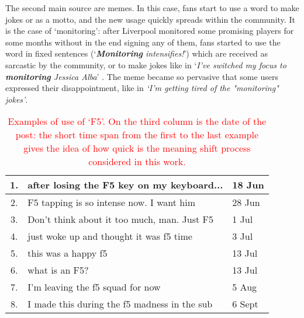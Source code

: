 The second main source are memes. In this case, fans start to use a
word to make jokes or as a motto, and the new usage quickly spreads
within the community. It is the case of `monitoring': after Liverpool
monitored some promising players for some months without in the end
signing any of them, fans started to use the word in fixed sentences
(`\textit{\textbf{Monitoring} intensifies!}') which are received as sarcastic by the
community, or to make jokes like in `\textit{I've switched my focus to
\textbf{monitoring} Jessica Alba}' . The meme became so pervasive that some users expressed their disappointment, like in \textit{`I'm getting tired of the "monitoring" jokes'}. 

\begin{table}[t]\centering   \small
    \begin{tabular}{cp{5.5cm}l}
        \hline
        1. & after losing the F5 key on my keyboard... & 18 Jun\\\hline
        2. & F5 tapping is so intense now. I want him & 28 Jun\\\hline
        3. & Don't think about it too much, man. Just F5 & 1 Jul\\\hline
        4. & just woke up and thought it was f5 time & 3 Jul\\\hline
        5. & this was a happy f5 & 13 Jul\\\hline
        6. & what is an F5? & 13 Jul \\\hline
        7. & I'm leaving the f5 squad for now & 5 Aug\\\hline
        8. & I made this during the f5 madness in the sub & 6 Sept\\\hline
        
    \end{tabular}
    \vspace*{-0.2cm}
    \caption{\textcolor{red}{Examples of use of `F5'. On the third column is the date of the post: the short time span  from the first to the last example gives the idea of how quick is the meaning shift process considered in this work.}}
    \vspace*{-0.2cm}
     \label{table:f5}
\end{table}
